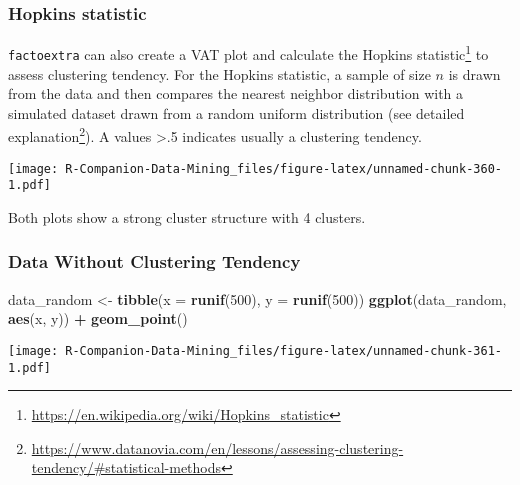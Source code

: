 \documentclass[
  notitlepage]{book}
\newenvironment{Shaded}{\begin{snugshade}}{\end{snugshade}}
\newcommand{\CommentTok}[1]{\textcolor[rgb]{0.56,0.35,0.01}{\textit{#1}}}
\newcommand{\DataTypeTok}[1]{\textcolor[rgb]{0.13,0.29,0.53}{#1}}
\newcommand{\DecValTok}[1]{\textcolor[rgb]{0.00,0.00,0.81}{#1}}
\newcommand{\KeywordTok}[1]{\textcolor[rgb]{0.13,0.29,0.53}{\textbf{#1}}}
\newcommand{\NormalTok}[1]{#1}
\newcommand{\OperatorTok}[1]{\textcolor[rgb]{0.81,0.36,0.00}{\textbf{#1}}}
\newcommand{\StringTok}[1]{\textcolor[rgb]{0.31,0.60,0.02}{#1}}
\DeclareRobustCommand{\href}[2]{#2\footnote{\url{#1}}}
\begin{document}
\hypertarget{hopkins-statistic}{%
\subsubsection{Hopkins statistic}\label{hopkins-statistic}}

\texttt{factoextra} can also create a VAT plot and calculate the \href{https://en.wikipedia.org/wiki/Hopkins_statistic}{Hopkins
statistic} to assess
clustering tendency. For the Hopkins statistic, a sample of size \(n\) is
drawn from the data and then compares the nearest neighbor distribution
with a simulated dataset drawn from a random uniform distribution (see
\href{https://www.datanovia.com/en/lessons/assessing-clustering-tendency/\#statistical-methods}{detailed
explanation}).
A values \textgreater.5 indicates usually a clustering tendency.

\begin{Shaded}
\end{Shaded}

\texttt{[image: R-Companion-Data-Mining\_files/figure-latex/unnamed-chunk-360-1.pdf]}

Both plots show a strong cluster structure with 4 clusters.

\hypertarget{data-without-clustering-tendency}{%
\subsubsection{Data Without Clustering Tendency}\label{data-without-clustering-tendency}}

\begin{Shaded}
\begin{Highlighting}[]
\NormalTok{data\_random \textless{}{-}}\StringTok{ }\KeywordTok{tibble}\NormalTok{(}\DataTypeTok{x =} \KeywordTok{runif}\NormalTok{(}\DecValTok{500}\NormalTok{), }\DataTypeTok{y =} \KeywordTok{runif}\NormalTok{(}\DecValTok{500}\NormalTok{))}
\KeywordTok{ggplot}\NormalTok{(data\_random, }\KeywordTok{aes}\NormalTok{(x, y)) }\OperatorTok{+}\StringTok{ }\KeywordTok{geom\_point}\NormalTok{()}
\end{Highlighting}
\end{Shaded}

\texttt{[image: R-Companion-Data-Mining\_files/figure-latex/unnamed-chunk-361-1.pdf]}
\end{document}
